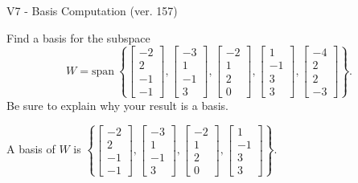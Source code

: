 \begin{exercise}
  \begin{exerciseTitle}V7 - Basis Computation (ver. 157)\end{exerciseTitle}
  \begin{exerciseStatement}
    Find a basis for the subspace 
\[W=\mathrm{span}\ \left\{\left[\begin{array}{r}
-2 \\
2 \\
-1 \\
-1
\end{array}\right] , \left[\begin{array}{r}
-3 \\
1 \\
-1 \\
3
\end{array}\right] , \left[\begin{array}{r}
-2 \\
1 \\
2 \\
0
\end{array}\right] , \left[\begin{array}{r}
1 \\
-1 \\
3 \\
3
\end{array}\right] , \left[\begin{array}{r}
-4 \\
2 \\
2 \\
-3
\end{array}\right]\right\}.\]
 Be sure to explain why your result is a basis.


  \end{exerciseStatement}
  \begin{exerciseAnswer}
   A basis of \(W\) is  \(\left\{\left[\begin{array}{r}
-2 \\
2 \\
-1 \\
-1
\end{array}\right] , \left[\begin{array}{r}
-3 \\
1 \\
-1 \\
3
\end{array}\right] , \left[\begin{array}{r}
-2 \\
1 \\
2 \\
0
\end{array}\right] , \left[\begin{array}{r}
1 \\
-1 \\
3 \\
3
\end{array}\right]\right\}\).
  


  \end{exerciseAnswer}
\end{exercise}